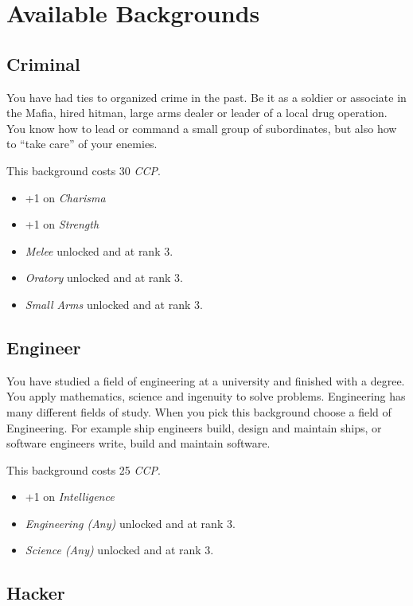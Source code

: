 \section{Available Backgrounds}
\label{sec:5-Available Backgrounds}

\subsection{Criminal}

You have had ties to organized crime in the past. Be it as a soldier or
associate in the Mafia, hired hitman, large arms dealer or leader of a
local drug operation. You know how to lead or command a small group of
subordinates, but also how to ``take care'' of your enemies.

This background costs 30 \emph{CCP}.

\begin{itemize}
\item +1 on \emph{Charisma}
\item +1 on \emph{Strength}
\item \emph{Melee} unlocked and at rank 3.
\item \emph{Oratory} unlocked and at rank 3.
\item \emph{Small Arms} unlocked and at rank 3.
\end{itemize}

\subsection{Engineer}

You have studied a field of engineering at a university and finished with
a degree. You apply mathematics, science and ingenuity to solve problems.
Engineering has many different fields of study. When you pick this background
choose a field of Engineering. For example ship engineers build, design and
maintain ships, or software engineers write, build and maintain software.

This background costs 25 \emph{CCP}.

\begin{itemize}
\item +1 on \emph{Intelligence}
\item \emph{Engineering (Any)} unlocked and at rank 3.
\item \emph{Science (Any)} unlocked and at rank 3.
\end{itemize}

\subsection{Hacker}

